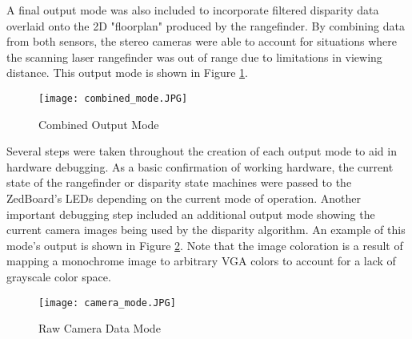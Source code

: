 \par
A final output mode was also included to incorporate filtered disparity data overlaid onto the 2D "floorplan" produced by the rangefinder. By combining data from both sensors, the stereo cameras were able to account for situations where the scanning laser rangefinder was out of range due to limitations in viewing distance. This output mode is shown in Figure \ref{combinedOut}.
\par
\begin{figure}[H] 
	\centerline{
	\texttt{[image: combined\_mode.JPG]}
	}
	\caption{Combined Output Mode}
	\label{combinedOut}
\end{figure}
\par
Several steps were taken throughout the creation of each output mode to aid in hardware debugging. As a basic confirmation of working hardware, the current state of the rangefinder or disparity state machines were passed to the ZedBoard's LEDs depending on the current mode of operation. Another important debugging step included an additional output mode showing the current camera images being used by the disparity algorithm. An example of this mode's output is shown in Figure \ref{camOutMode}. Note that the image coloration is a result of mapping a monochrome image to arbitrary VGA colors to account for a lack of grayscale color space.
\par
\begin{figure}[H] 
	\centerline{
	\texttt{[image: camera\_mode.JPG]}
	}
	\caption{Raw Camera Data Mode}
	\label{camOutMode}
\end{figure}
